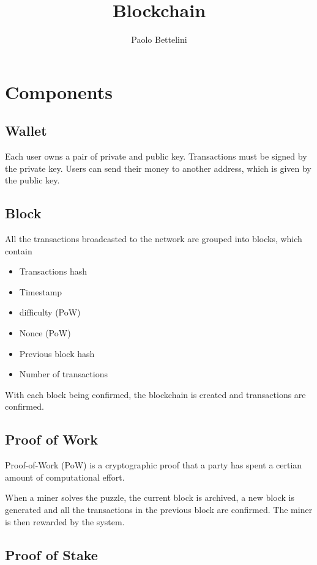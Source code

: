 \documentclass{article}
\title{Blockchain}
\author{Paolo Bettelini}
\date{}
\begin{document}
\maketitle
\tableofcontents
\pagebreak

\section{Components}

\subsection{Wallet}

Each user owns a pair of private and public key.
Transactions must be signed by the private key. Users
can send their money to another address, which is given by the public key.

\subsection{Block}

All the transactions broadcasted to the network are grouped into blocks, which contain

\begin{itemize}
    \item Transactions hash
    \item Timestamp
    \item difficulty (PoW)
    \item Nonce (PoW)
    \item Previous block hash
    \item Number of transactions
\end{itemize}

With each block being confirmed, the blockchain is created
and transactions are confirmed.

\subsection{Proof of Work}

Proof-of-Work (PoW) is a cryptographic proof that a party has spent
a certian amount of computational effort.

When a miner solves the puzzle, the current block is archived, a new
block is generated and all the transactions in the previous block are confirmed.
The miner is then rewarded by the system.

\subsection{Proof of Stake}
\end{document}
